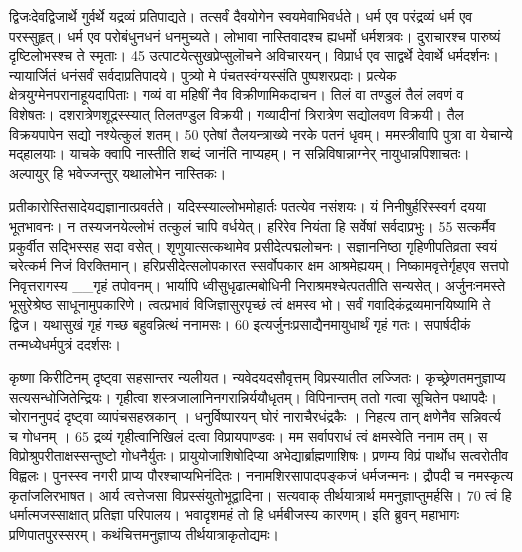 द्विजःदेवद्विजार्थे गुर्वर्थे यद्रव्यं प्रतिपाद्यते।
 तत्सर्वं दैवयोगेन स्वयमेवाभिवर्धते।
 धर्म एव परंद्रव्यं धर्म एव परस्सुहृत्।
 धर्म एव परोबंधुनधनं धनमुच्यते।
 लोभावा नास्तिवादश्च ह्यधर्मो धर्मशत्रवः।
 दुराचारश्च पारुष्यं दृष्टिलोभस्श्च ते स्मृताः।
 45 उत्पाटयेत्सुखप्रेप्सुलॊचने अविचारयन्।
 विप्रार्ध एव साद्वर्थे देवार्थे धर्मदर्शनः।
 न्यायार्जितं धनंसर्वं सर्वदाप्रतिपादये।
 पुत्र्यो मे पंचतस्वंग्यस्संति पुष्पशरप्रदाः।
 प्रत्येक क्षेत्रयुग्मेनपरानाहूयदापिताः।
 गव्यं वा महिषीं नैव विक्रीणामिकदाचन।
 तिलं वा तण्डुलं तैलं लवणं व विशेषतः।
 दशरात्रेणशूद्रस्स्यात् तिलतण्डुल विक्रयी।
 गव्यादीनां त्रिरात्रेण सद्योलवण विक्रयी।
 तैल विक्रयपापेन सद्यो नश्येत्कुलं शतम्।
 50 एतेषां तैलयन्त्राख्ये नरके पतनं धृवम्।
 ममस्त्रीवापि पुत्रा वा येचान्ये मद्हालयाः।
 याचके क्वापि नास्तीति शब्दं जानंति नाप्यहम्।
 न सन्निविषान्नाग्नेर् नायुधान्नपिशाचतः।
 अल्पायुर् हि भवेज्जन्तुर् यथालोभेन नास्तिकः।
 
प्रतीकारोस्तिसादेयद्यज्ञानात्प्रवर्तते।
 यदिस्स्याल्लोभमोहार्तः पतत्येव नसंशयः।
 यं निनीषुर्हरिस्स्वर्ग दयया भूतभावनः।
 न तस्यजनयेल्लोभं तत्कुलं चापि वर्धयेत्।
 हरिरेव नियंता हि सर्वेषां सर्वदाप्रभुः।
 55 सत्कर्मैव प्रकुर्वीत सद्भिस्सह सदा वसेत्।
 शृणुयात्सत्कथामेव प्रसीदेत्पद्मलोचनः।
 सज्ञाननिष्ठा गृहिणीपतिव्रता स्वयं चरेत्कर्म
निजं विरक्तिमान्।
 हरिप्रसीदेत्सलोपकारत स्सर्वोपकार
क्षम आश्रमेह्ययम्।
 निष्कामवृत्तेर्गृहएव सत्तपो निवृत्तरागस्य
__गृहं तपोवनम्।
 भार्यापि ध्वीसुधृढात्मबोधिनी
निराश्रमश्चेत्पततीति सन्यसेत्।
 अर्जुनःनमस्ते भूसुरेश्रेष्ठ साधूनामुपकारिणे।
 त्वत्प्रभावं विजिज्ञासुरपृच्छं त्वं क्षमस्व भो।
 सर्वं गवादिकंद्रव्यमानयिष्यामि ते द्विज।
 यथासुखं गृहं गच्छ बहुवन्नित्थं ननामसः।
 60 इत्यर्जुनःप्रसाद्यैनमायुधार्थं गृहं गतः।
 सपार्षदीकं तन्मध्येधर्मपुत्रं ददर्शसः।
 
कृष्णा किरीटिनम् दृष्ट्वा सहसान्तर न्यलीयत।
 न्यवेदयदसौवृत्तम् विप्रस्यातीत लज्जितः।
 कृच्छ्रेणतमनुज्ञाप्य सत्यसन्धोजितेन्द्रियः।
 गृहीत्वा शस्त्रजालानिनगरान्निर्ययौधृतम्।
 विपिनान्तम् ततो गत्वा सूचितेन पथापदैः।
 चोराननुपदं दृष्ट्वा व्यापंचसहस्रकान् ।
 धनुर्विष्पारयन् घोरं नाराचैरधंद्रकैः ।
 निहत्य तान् क्षणेनैव सन्निवर्त्य च गोधनम् ।
 65 द्रव्यं गृहीत्वानिखिलं दत्वा विप्रायपाण्डवः।
 मम सर्वापराधं त्वं क्षमस्वेति ननाम तम्।
 स विप्रोश्रुपरीताक्षस्सन्तुष्टो गोधनैर्युतः।
 प्रायुयोजाशिषोदिप्या अभेद्यार्ब्राह्मणाशिषः।
 प्रणम्य विप्रं पार्थोध सत्वरोतीव विह्वलः।
 पुनस्स्व नगरी प्राप्य पौरश्चाप्यभिनंदितः।
 ननामशिरसापादपङ्कजं धर्मजन्मनः।
 द्रौपदी च नमस्कृत्य कृतांजलिरभाषत।
 आर्य त्वत्तेजसा विप्रस्संयुतोभूद्वादिना।
 सत्यवाक् तीर्थयात्रार्थ ममनुज्ञाप्तुमर्हसि।
 70 त्वं हि धर्मात्मजस्साक्षात् प्रतिज्ञा परिपालय।
 भवादृशमहं तो हि धर्मबीजस्य कारणम्।
 इति ब्रुवन् महाभागः प्रणिपातपुरस्सरम्।
 कथंचित्तमनुज्ञाप्य तीर्थयात्राकृतोद्यमः।
 
